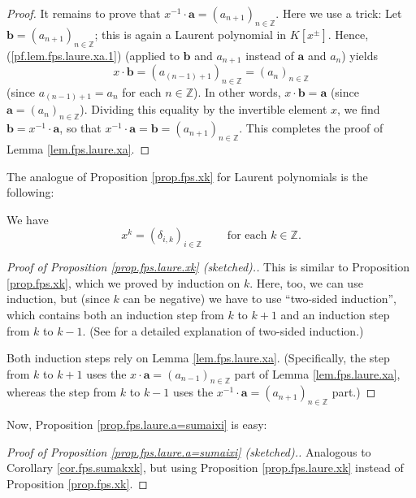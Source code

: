 \begin{fineprint}
\begin{proof}
It remains to prove that $x^{-1}\cdot\mathbf{a}=\left(  a_{n+1}\right)
_{n\in\mathbb{Z}}$. Here we use a trick: Let $\mathbf{b}=\left(
a_{n+1}\right)  _{n\in\mathbb{Z}}$; this is again a Laurent polynomial in
$K\left[  x^{\pm}\right]  $. Hence, (\ref{pf.lem.fps.laure.xa.1}) (applied to
$\mathbf{b}$ and $a_{n+1}$ instead of $\mathbf{a}$ and $a_{n}$) yields%
\[
x\cdot\mathbf{b}=\left(  a_{\left(  n-1\right)  +1}\right)  _{n\in\mathbb{Z}%
}=\left(  a_{n}\right)  _{n\in\mathbb{Z}}%
\]
(since $a_{\left(  n-1\right)  +1}=a_{n}$ for each $n\in\mathbb{Z}$). In other
words, $x\cdot\mathbf{b}=\mathbf{a}$ (since $\mathbf{a}=\left(  a_{n}\right)
_{n\in\mathbb{Z}}$). Dividing this equality by the invertible element $x$, we
find $\mathbf{b}=x^{-1}\cdot\mathbf{a}$, so that $x^{-1}\cdot\mathbf{a}%
=\mathbf{b}=\left(  a_{n+1}\right)  _{n\in\mathbb{Z}}$. This completes the
proof of Lemma \ref{lem.fps.laure.xa}.
\end{proof}

The analogue of Proposition \ref{prop.fps.xk} for Laurent polynomials is the following:

\begin{proposition}
\label{prop.fps.laure.xk}We have%
\[
x^{k}=\left(  \delta_{i,k}\right)  _{i\in\mathbb{Z}}%
\ \ \ \ \ \ \ \ \ \ \text{for each }k\in\mathbb{Z}.
\]

\end{proposition}

\begin{proof}
[Proof of Proposition \ref{prop.fps.laure.xk} (sketched).]This is similar to
Proposition \ref{prop.fps.xk}, which we proved by induction on $k$. Here, too,
we can use induction, but (since $k$ can be negative) we have to use
\textquotedblleft two-sided induction\textquotedblright, which contains both
an induction step from $k$ to $k+1$ and an induction step from $k$ to $k-1$.
(See \cite[\S 2.15]{detnotes} for a detailed explanation of two-sided induction.)

Both induction steps rely on Lemma \ref{lem.fps.laure.xa}. (Specifically, the
step from $k$ to $k+1$ uses the $x\cdot\mathbf{a}=\left(  a_{n-1}\right)
_{n\in\mathbb{Z}}$ part of Lemma \ref{lem.fps.laure.xa}, whereas the step from
$k$ to $k-1$ uses the $x^{-1}\cdot\mathbf{a}=\left(  a_{n+1}\right)
_{n\in\mathbb{Z}}$ part.)
\end{proof}

Now, Proposition \ref{prop.fps.laure.a=sumaixi} is easy:

\begin{proof}
[Proof of Proposition \ref{prop.fps.laure.a=sumaixi} (sketched).]Analogous to
Corollary \ref{cor.fps.sumakxk}, but using Proposition \ref{prop.fps.laure.xk}
instead of Proposition \ref{prop.fps.xk}.
\end{proof}


\end{fineprint}
